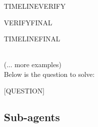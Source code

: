 \begin{userprompt}[title={User Prompt}]
\quad{}TIMELINEVERIFY

\quad{}VERIFYFINAL

\quad{}TIMELINEFINAL

\\

(... more examples) \\

Below is the question to solve: 

[QUESTION]


\end{userprompt}





\subsection{Sub-agents}
\label{app:sub_agents}


